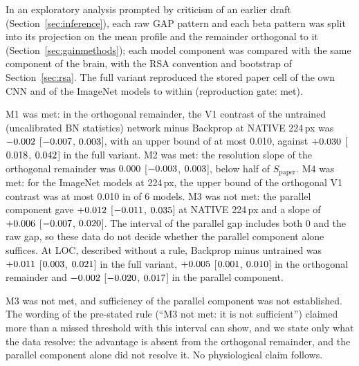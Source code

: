 In an exploratory analysis prompted by criticism of an earlier draft (Section~\ref{sec:inference}),
each raw GAP pattern and each beta pattern was split into its projection on the mean profile
and the remainder orthogonal to it (Section~\ref{sec:gainmethods}); each model component was
compared with the same component of the brain, with the RSA convention and bootstrap of
Section~\ref{sec:rsa}. The full variant reproduced the stored paper cell of the own CNN and
of the ImageNet models to within \MpGateMaxDelta{} (reproduction gate: met).

M1 was met: in the orthogonal remainder, the V1 contrast of the untrained (uncalibrated BN
statistics) network minus Backprop at NATIVE 224\,px was $-0.002$
[$-0.007$, $0.003$], with an upper bound of
at most 0.010, against $+0.030$ [$0.018$,
$0.042$] in the full variant. M2 was met: the resolution slope of
the orthogonal remainder was $0.000$ [$-0.003$, $0.003$],
below half of $S_{\mathrm{paper}}$. M4 was met: for the ImageNet models at 224\,px, the upper
bound of the orthogonal V1 contrast was at most 0.010 in \MpMFourModels{} of 6 models. M3 was
not met: the parallel component gave $+0.012$
[$-0.011$, $0.035$] at NATIVE 224\,px and a
slope of $+0.006$ [$-0.007$, $0.020$]. The interval of the
parallel gap includes both 0 and the raw gap, so these data do not decide whether the
parallel component alone suffices. At LOC, described without a rule, Backprop minus
untrained was $+0.011$ [$0.003$, $0.021$] in the full variant,
$+0.005$ [$0.001$, $0.010$] in the orthogonal remainder and
$-0.002$ [$-0.020$, $0.017$] in the parallel component.

M3 was not met, and sufficiency of the parallel component was not established. The wording
of the pre-stated rule (``M3 not met: it is not sufficient'') claimed more than a missed
threshold with this interval can show, and we state only what the data resolve: the
advantage is absent from the orthogonal remainder, and the parallel component alone did not
resolve it. No physiological claim follows.

